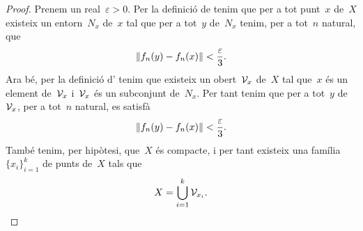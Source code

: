 \documentclass[../../main.tex]{subfiles}
\begin{document}
    \begin{proof}
        Prenem un real~\(\varepsilon>0\).
        Per la definició de  tenim que per a tot punt~\(x\) de~\(X\) existeix un entorn~\(N_{x}\) de~\(x\) tal que per a tot~\(y\) de~\(N_{x}\) tenim, per a tot~\(n\) natural, que
        \[
            \norm{f_{n}(y)-f_{n}(x)}<\frac{\varepsilon}{3}.
        \]
        Ara bé, per la definició d' tenim que existeix un obert~\(\mathcal{V}_{x}\) de~\(X\) tal que~\(x\) és un element de~\(\mathcal{V}_{x}\) i~\(\mathcal{V}_{x}\) és un subconjunt de~\(N_{x}\).
        Per tant tenim que per a tot~\(y\) de~\(\mathcal{V}_{x}\), per a tot~\(n\) natural, es satisfà
        \begin{equation}
            \label{thm:Teorema-dArzela-Ascoli:eq2}
            \norm{f_{n}(y)-f_{n}(x)}<\frac{\varepsilon}{3}.
        \end{equation}
        També tenim, per hipòtesi, que~\(X\) és compacte, i per tant existeix una família~\(\{x_{i}\}_{i=1}^{k}\) de punts de~\(X\) tals que
        \begin{equation}
            \label{thm:Teorema-dArzela-Ascoli:eq1}
            X=\bigcup_{i=1}^{k}\mathcal{V}_{x_{i}}.
        \end{equation}


\end{proof}
\end{document}
